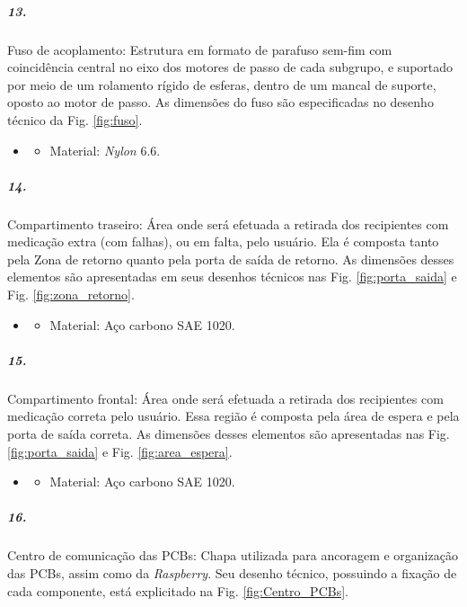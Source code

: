 \subparagraph*{13.}\label{retorno_fuso}
Fuso de acoplamento: Estrutura em formato de parafuso sem-fim com coincidência central no eixo dos motores de passo de cada subgrupo, e suportado por meio de um rolamento rígido de esferas, dentro de um mancal de suporte, oposto ao motor de passo. As dimensões do fuso são especificadas no desenho técnico da Fig. \ref{fig:fuso}.

\begin{itemize}
   \item[]
   \begin{itemize}
       \item Material: \textit{Nylon} 6.6.
   \end{itemize}
   \end{itemize}
 

\subparagraph*{14.} \label{retorno_porta}
Compartimento traseiro: Área onde será efetuada a retirada dos recipientes com medicação extra (com falhas), ou em falta, pelo usuário. Ela é composta tanto pela Zona de retorno quanto pela porta de saída de retorno. As dimensões desses elementos são apresentadas em seus desenhos técnicos nas Fig. \ref{fig:porta_saida} e Fig. \ref{fig:zona_retorno}.

 \begin{itemize}
   \item[]
   \begin{itemize}
       \item Material: Aço carbono SAE 1020.
   \end{itemize}
   \end{itemize}

\subparagraph*{15.}
Compartimento frontal: Área onde será efetuada a retirada dos recipientes com medicação correta pelo usuário. Essa região é composta pela área de espera e pela porta de saída correta. As dimensões desses elementos são apresentadas nas Fig. \ref{fig:porta_saida} e Fig. \ref{fig:area_espera}.

 \begin{itemize}
   \item[]
   \begin{itemize}
       \item Material: Aço carbono SAE 1020.
   \end{itemize}
   \end{itemize}
   
 \subparagraph*{16.} \label{retorno_Centro_PCBs}
 Centro de comunicação das PCBs: Chapa utilizada para ancoragem e organização das PCBs, assim como da \textit{Raspberry}. Seu desenho técnico, possuindo a fixação de cada componente, está explicitado na Fig. \ref{fig:Centro_PCBs}.

